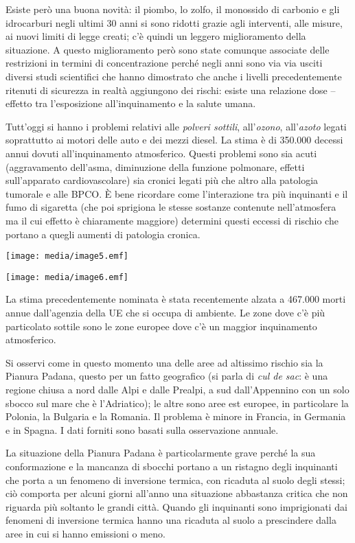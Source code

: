 \documentclass[]{article}
\begin{document}
Esiste però una buona novità: il piombo, lo zolfo, il monossido di
carbonio e gli idrocarburi negli ultimi 30 anni si sono ridotti grazie
agli interventi, alle misure, ai nuovi limiti di legge creati; c'è
quindi un leggero miglioramento della situazione. A questo miglioramento
però sono state comunque associate delle restrizioni in termini di
concentrazione perché negli anni sono via via usciti diversi studi
scientifici che hanno dimostrato che anche i livelli precedentemente
ritenuti di sicurezza in realtà aggiungono dei rischi: esiste una
relazione dose -- effetto tra l'esposizione all'inquinamento e la salute
umana.

Tutt'oggi si hanno i problemi relativi alle \emph{polveri sottili},
all'\emph{ozono}, all'\emph{azoto} legati soprattutto ai motori delle
auto e dei mezzi diesel. La stima è di 350.000 decessi annui dovuti
all'inquinamento atmosferico. Questi problemi sono sia acuti
(aggravamento dell'asma, diminuzione della funzione polmonare, effetti
sull'apparato cardiovascolare) sia cronici legati più che altro alla
patologia tumorale e alle BPCO. È bene ricordare come l'interazione tra
più inquinanti e il fumo di sigaretta (che poi sprigiona le stesse
sostanze contenute nell'atmosfera ma il cui effetto è chiaramente
maggiore) determini questi eccessi di rischio che portano a quegli
aumenti di patologia cronica.

\texttt{[image: media/image5.emf]}

\texttt{[image: media/image6.emf]}

La stima precedentemente nominata è stata recentemente alzata a 467.000
morti annue dall'agenzia della UE che si occupa di ambiente. Le zone
dove c'è più particolato sottile sono le zone europee dove c'è un
maggior inquinamento atmosferico.

Si osservi come in questo momento una delle aree ad altissimo rischio
sia la Pianura Padana, questo per un fatto geografico (si parla di
\emph{cul de sac}: è una regione chiusa a nord dalle Alpi e dalle
Prealpi, a sud dall'Appennino con un solo sbocco sul mare che è
l'Adriatico); le altre sono aree est europee, in particolare la Polonia,
la Bulgaria e la Romania. Il problema è minore in Francia, in Germania e
in Spagna. I dati forniti sono basati sulla osservazione annuale.

La situazione della Pianura Padana è particolarmente grave perché la sua
conformazione e la mancanza di sbocchi portano a un ristagno degli
inquinanti che porta a un fenomeno di inversione termica, con ricaduta
al suolo degli stessi; ciò comporta per alcuni giorni all'anno una
situazione abbastanza critica che non riguarda più soltanto le grandi
città. Quando gli inquinanti sono imprigionati dai fenomeni di
inversione termica hanno una ricaduta al suolo a prescindere dalla aree
in cui si hanno emissioni o meno.
\end{document}
